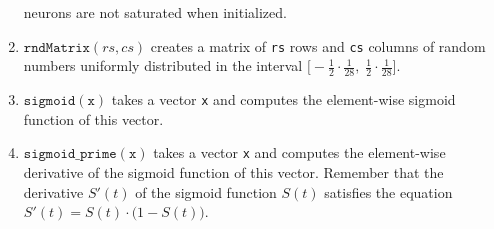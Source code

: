 \begin{enumerate}
      neurons are not saturated when initialized.
\item $\texttt{rndMatrix}(rs, cs)$ creates a matrix of \texttt{rs} rows and \texttt{cs} columns of random
      numbers uniformly distributed in the interval
      $\bigl[-\frac{1}{2}\cdot\frac{1}{28},\; \frac{1}{2}\cdot\frac{1}{28}\bigr]$.
\item $\texttt{sigmoid}(\texttt{x})$ takes a vector \texttt{x} and computes the element-wise sigmoid function of
      this vector.
\item $\texttt{sigmoid\_prime}(\texttt{x})$ takes a vector \texttt{x} and computes the element-wise derivative
      of the sigmoid function of this vector.  Remember that the derivative $S'(t)$ of the sigmoid function $S(t)$
      satisfies the equation
      \\[0.2cm]
      \hspace*{1.3cm}
      $S'(t) = S(t) \cdot \bigl(1 - S(t)\bigr)$.
\end{enumerate}


